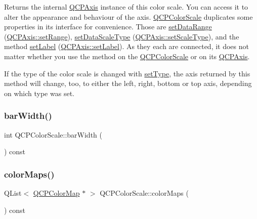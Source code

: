 Returns the internal \mbox{\hyperlink{class_q_c_p_axis}{Q\+C\+P\+Axis}} instance of this color scale. You can access it to alter the appearance and behaviour of the axis. \mbox{\hyperlink{class_q_c_p_color_scale}{Q\+C\+P\+Color\+Scale}} duplicates some properties in its interface for convenience. Those are \mbox{\hyperlink{class_q_c_p_color_scale_abe88633003a26d1e756aa74984587fef}{set\+Data\+Range}} (\mbox{\hyperlink{class_q_c_p_axis_aebdfea5d44c3a0ad2b4700cd4d25b641}{Q\+C\+P\+Axis\+::set\+Range}}), \mbox{\hyperlink{class_q_c_p_color_scale_aeb6107d67dd7325145b2498abae67fc3}{set\+Data\+Scale\+Type}} (\mbox{\hyperlink{class_q_c_p_axis_adef29cae617af4f519f6c40d1a866ca6}{Q\+C\+P\+Axis\+::set\+Scale\+Type}}), and the method \mbox{\hyperlink{class_q_c_p_color_scale_aee124ae8396320cacf8276e9a0fbb8ce}{set\+Label}} (\mbox{\hyperlink{class_q_c_p_axis_a33bcc382c111c9f31bb0687352a2dea4}{Q\+C\+P\+Axis\+::set\+Label}}). As they each are connected, it does not matter whether you use the method on the \mbox{\hyperlink{class_q_c_p_color_scale}{Q\+C\+P\+Color\+Scale}} or on its \mbox{\hyperlink{class_q_c_p_axis}{Q\+C\+P\+Axis}}.

If the type of the color scale is changed with \mbox{\hyperlink{class_q_c_p_color_scale_a1bf9bdb291927c422dd66b404b206f1f}{set\+Type}}, the axis returned by this method will change, too, to either the left, right, bottom or top axis, depending on which type was set. \mbox{\label{class_q_c_p_color_scale_ae02ab8e4bfaa919577992e73242f491f}} 
\subsubsection{\texorpdfstring{barWidth()}{barWidth()}}
{\footnotesize\ttfamily int Q\+C\+P\+Color\+Scale\+::bar\+Width (\begin{DoxyParamCaption}{ }\end{DoxyParamCaption}) const\hspace{0.3cm}{\ttfamily [inline]}}

\mbox{\label{class_q_c_p_color_scale_a556adc6b0216ebc1cc4317c541956d06}} 
\subsubsection{\texorpdfstring{colorMaps()}{colorMaps()}}
{\footnotesize\ttfamily Q\+List$<$ \mbox{\hyperlink{class_q_c_p_color_map}{Q\+C\+P\+Color\+Map}} $\ast$ $>$ Q\+C\+P\+Color\+Scale\+::color\+Maps (\begin{DoxyParamCaption}{ }\end{DoxyParamCaption}) const}


